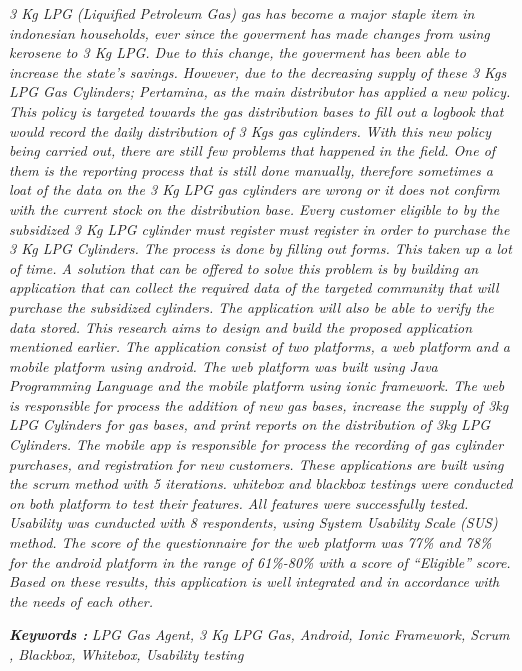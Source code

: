 \begin{abstracteng}
\textit{3 Kg LPG (Liquified Petroleum Gas) gas has become a major staple item in indonesian households, ever since the goverment has made changes  from using kerosene to 3 Kg LPG. Due to this change, the goverment has been able to increase the state’s savings. However, due to the decreasing supply of these 3 Kgs LPG Gas Cylinders; Pertamina, as the main distributor has applied a new policy. This policy is targeted towards the gas distribution bases to fill out a logbook that would record the daily distribution of 3 Kgs gas cylinders. With this new policy being carried out, there are still few problems that happened in the field. One of them is the reporting process that is still done manually, therefore sometimes a loat of the data on the 3 Kg LPG gas cylinders are wrong or it does not confirm with the current stock on the distribution base. Every customer eligible to by the subsidized 3 Kg LPG cylinder must register must register in order to purchase the 3 Kg LPG Cylinders. The process is done by filling out forms. This taken up a lot of time. A solution that can be offered to solve this problem is by building an application that can collect the required data of the targeted community that will purchase the subsidized cylinders. The application will also be able to verify the data stored. This research aims to design and build the proposed application mentioned earlier. The application consist of two platforms, a web platform and a mobile platform using android. The web platform was built using Java Programming Language and the mobile platform using ionic framework. The web is responsible for process the addition of new gas bases, increase the supply of 3kg LPG Cylinders for gas bases, and print reports on the distribution of 3kg LPG Cylinders. The mobile app is responsible for process the recording of gas cylinder purchases, and registration for new customers. These applications are built using the scrum method with 5 iterations. whitebox and blackbox testings were conducted on both platform to test their features. All features were successfully tested. Usability was cunducted with 8 respondents, using System Usability Scale (SUS) method. The score of the questionnaire for the web platform was 77\% and 78\% for the android platform in the range of 61\%-80\% with a score of “Eligible” score.  Based on these results, this application is well integrated and in accordance with the needs of each other.}

\bigskip
\noindent
\textbf{\emph{Keywords :}} \textit{LPG Gas Agent, 3 Kg LPG Gas, Android, Ionic Framework, Scrum , Blackbox, Whitebox, Usability testing}
\end{abstracteng}